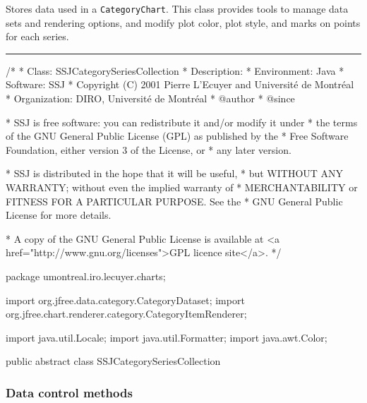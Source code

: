 
Stores data used in a \texttt{CategoryChart}.
This class provides tools to manage data sets and rendering options, and modify
plot color, plot style, and marks on points for each series.

\bigskip\hrule
\begin{code}
\begin{hide}
/*
 * Class:        SSJCategorySeriesCollection
 * Description:  
 * Environment:  Java
 * Software:     SSJ 
 * Copyright (C) 2001  Pierre L'Ecuyer and Université de Montréal
 * Organization: DIRO, Université de Montréal
 * @author       
 * @since

 * SSJ is free software: you can redistribute it and/or modify it under
 * the terms of the GNU General Public License (GPL) as published by the
 * Free Software Foundation, either version 3 of the License, or
 * any later version.

 * SSJ is distributed in the hope that it will be useful,
 * but WITHOUT ANY WARRANTY; without even the implied warranty of
 * MERCHANTABILITY or FITNESS FOR A PARTICULAR PURPOSE.  See the
 * GNU General Public License for more details.

 * A copy of the GNU General Public License is available at
   <a href="http://www.gnu.org/licenses">GPL licence site</a>.
 */
\end{hide}
package umontreal.iro.lecuyer.charts;\begin{hide}

import   org.jfree.data.category.CategoryDataset;
import   org.jfree.chart.renderer.category.CategoryItemRenderer;

import   java.util.Locale;
import   java.util.Formatter;
import   java.awt.Color;\end{hide}

public abstract class SSJCategorySeriesCollection \begin{hide} {
   protected CategoryItemRenderer renderer;
   protected CategoryDataset seriesCollection;
\end{hide}
\end{code}

\subsubsection*{Data control methods}

